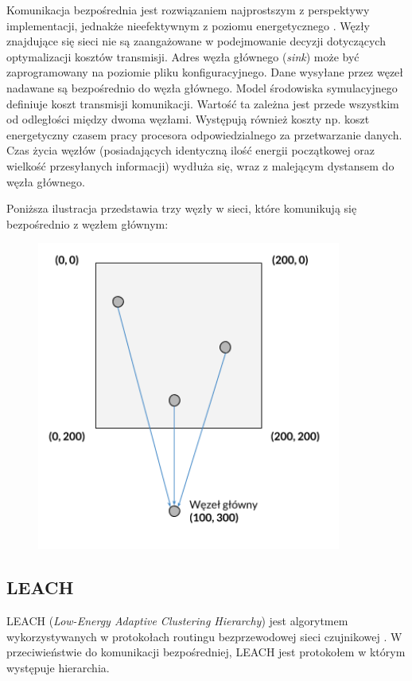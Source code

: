 \documentclass[a4paper,12pt,twoside,openany]{report}
\begin{document}
Komunikacja bezpośrednia jest rozwiązaniem najprostszym z perspektywy implementacji, jednakże nieefektywnym z poziomu energetycznego \cite{WSN-routing} \cite{Wiley-WSN}. 
Węzły znajdujące się sieci nie są zaangażowane w podejmowanie decyzji dotyczących optymalizacji kosztów transmisji. 
Adres węzła głównego (\textit{sink}) może być zaprogramowany na poziomie pliku konfiguracyjnego.
Dane wysyłane przez węzeł nadawane są bezpośrednio do węzła głównego.
Model środowiska symulacyjnego definiuje koszt transmisji komunikacji. Wartość ta zależna jest przede wszystkim od odległości między dwoma węzłami.
Występują również koszty np. koszt energetyczny czasem pracy procesora odpowiedzialnego za przetwarzanie danych.
Czas życia węzłów (posiadających identyczną ilość energii początkowej oraz wielkość przesyłanych informacji) wydłuża się, wraz z malejącym dystansem do węzła głównego.

Poniższa ilustracja przedstawia trzy węzły w sieci, które komunikują się bezpośrednio z węzłem głównym:

\begin{figure}[H]
 \centering
 \includegraphics[width=10cm]{images/komunikacja_bezposrednia.png}
\end{figure}

\subsection{LEACH}

LEACH (\textit{Low-Energy Adaptive Clustering Hierarchy}) jest algorytmem wykorzystywanych w protokołach routingu bezprzewodowej sieci czujnikowej \cite{Akyildiz}.
W przeciwieństwie do komunikacji bezpośredniej, LEACH jest protokołem w którym występuje hierarchia. 
\end{document}
